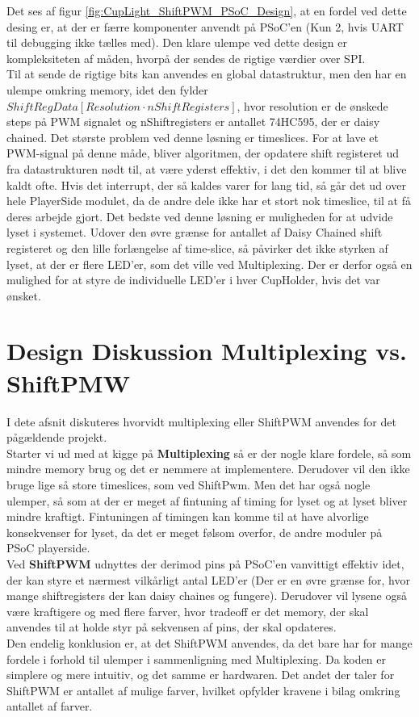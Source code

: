 \documentclass[Softwaredesign/Softwaredesign_main.tex]{subfiles}
\begin{document}
Det ses af figur \ref{fig:CupLight_ShiftPWM_PSoC_Design}, at en fordel ved dette desing er, at der er færre komponenter anvendt på PSoC'en (Kun 2, hvis UART til debugging ikke tælles med). Den klare ulempe ved dette design er kompleksiteten af måden, hvorpå der sendes de rigtige værdier over SPI.\\
Til at sende de rigtige bits kan anvendes en global datastruktur, men den har en ulempe omkring memory, idet den fylder $ShiftRegData[Resolution \cdot nShiftRegisters]$, hvor resolution er de ønskede steps på PWM signalet og nShiftregisters er antallet 74HC595, der er daisy chained. Det største problem ved denne løsning er timeslices. For at lave et PWM-signal på denne måde, bliver algoritmen, der opdatere shift registeret ud fra datastrukturen nødt til, at være yderst effektiv, i det den kommer til at blive kaldt ofte. Hvis det interrupt, der så kaldes varer for lang tid, så går det ud over hele PlayerSide modulet, da de andre dele ikke har et stort nok timeslice, til at få deres arbejde gjort. Det bedste ved denne løsning er muligheden for at udvide lyset i systemet. Udover den øvre grænse for antallet af Daisy Chained shift registeret og den lille forlængelse af time-slice, så påvirker det ikke styrken af lyset, at der er flere LED'er, som det ville ved Multiplexing. Der er derfor også en mulighed for at styre de individuelle LED'er i hver CupHolder, hvis det var ønsket.

\section{Design Diskussion Multiplexing vs. ShiftPMW}
I dete afsnit diskuteres hvorvidt multiplexing eller ShiftPWM anvendes for det pågældende projekt.\\
Starter vi ud med at kigge på \textbf{Multiplexing} så er der nogle klare fordele, så som mindre memory brug og det er nemmere at implementere. Derudover vil den ikke bruge lige så store timeslices, som ved ShiftPwm. Men det har også nogle ulemper, så som at der er meget af fintuning af timing for lyset og at lyset bliver mindre kraftigt. Fintuningen af timingen kan komme til at have alvorlige konsekvenser for lyset, da det er meget følsom overfor, de andre moduler på PSoC playerside.
\\Ved \textbf{ShiftPWM} udnyttes der derimod pins på PSoC'en vanvittigt effektiv idet, der kan styre et nærmest vilkårligt antal LED'er (Der er en øvre grænse for, hvor mange shiftregisters der kan daisy chaines og fungere). Derudover vil lysene også være kraftigere og med flere farver, hvor tradeoff er det memory, der skal anvendes til at holde styr på sekvensen af pins, der skal opdateres.
\\Den endelig konklusion er, at det ShiftPWM anvendes, da det bare har for mange fordele i forhold til ulemper i sammenligning med Multiplexing. Da koden er simplere og mere intuitiv, og det samme er hardwaren. Det andet der taler for ShiftPWM er antallet af mulige farver, hvilket opfylder kravene i bilag  omkring antallet af farver.
\end{document}
